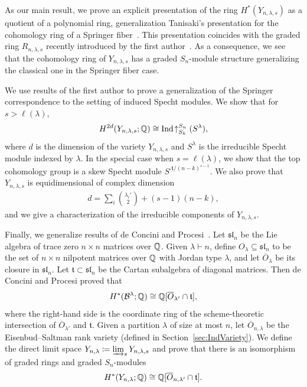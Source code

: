\documentclass[12pt]{amsart}
\newcommand{\la}{\lambda}
\begin{document}
As our main result, we prove an explicit presentation of the ring $H^*(Y_{n,\la,s})$ as a quotient of a polynomial ring, generalization Tanisaki's presentation for the cohomology ring of a Springer fiber~\cite{Tanisaki}. This presentation coincides with the graded ring $R_{n,\lambda,s}$ recently introduced by the first author~\cite{GriffinOSP}. 
As a consequence, we see that the cohomology ring of $Y_{n,\lambda,s}$ has a graded $S_n$-module structure generalizing the classical one in the Springer fiber case.

We use results of the first author to prove a generalization of the  Springer correspondence to the setting of induced Specht modules. We show that for $s>\ell(\lambda)$, 
\begin{align}
H^{2d}(Y_{n,\lambda,s};\mathbb{Q}) \cong \mathrm{Ind}\!\uparrow_{S_k}^{S_n} (S^\lambda),
\end{align}
where $d$ is the dimension of the variety $Y_{n,\lambda,s}$ and $S^\la$ is the irreducible Specht module indexed by $\lambda$. In the special case when $s=\ell(\lambda)$, we show that the top cohomology group is a skew Specht module $S^{\Lambda/(n-k)^{s-1}}$. We also prove that $Y_{n,\lambda,s}$ is equidimensional of complex dimension
\begin{align}
    d = \sum_i \binom{\lambda_i'}{2} + (s-1)(n-k),
\end{align}
and we give a characterization of the irreducible components of $Y_{n,\la,s}$.

Finally, we generalize results of de Concini and Procesi~\cite{dCP}. Let $\mathfrak{sl}_n$ be the Lie algebra of trace zero $n\times n$ matrices over $\mathbb{Q}$. Given $\la\vdash n$, define $O_\lambda\subseteq \mathfrak{sl}_n$ to be the set of $n\times n$ nilpotent matrices over $\mathbb{Q}$ with Jordan type $\lambda$, and let $\overline{O}_\lambda$ be its closure in $\mathfrak{sl}_n$. Let $\mathfrak{t}\subset \mathfrak{sl}_n$ be the Cartan subalgebra of diagonal matrices. Then de Concini and Procesi proved that
\begin{align}
    H^*(\cB^\la;\bQ) \cong \bQ[\overline{O}_{\la'}\cap \mathfrak{t}],
\end{align}
where the right-hand side is the coordinate ring of the scheme-theoretic intersection of $\overline{O}_{\la'}$ and $\mathfrak{t}$. Given a partition $\lambda$ of size at most $n$, let $\overline{O}_{n,\la}$ be the Eisenbud--Saltman rank variety (defined in Section~\ref{sec:IndVariety}). We define the direct limit space $Y_{n,\la} \coloneqq \varinjlim_s Y_{n,\la,s}$ and prove that there is an isomorphism of graded rings and graded $S_n$-modules
\begin{align}\label{eq:dCPGeneralization}
    H^*(Y_{n,\la};\bQ) \cong \bQ[\overline{O}_{n,\la'}\cap \mathfrak{t}].
\end{align}
\end{document}
